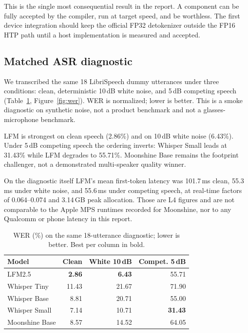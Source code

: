 \documentclass[10pt,twocolumn,letterpaper]{article}
\begin{document}
This is the single most consequential result in the report. A component can be
fully accepted by the compiler, run at target speed, and be worthless. The
first device integration should keep the official FP32 detokenizer outside the
FP16 HTP path until a host implementation is measured and accepted.

\subsection{Matched ASR diagnostic}

We transcribed the same 18 LibriSpeech dummy utterances under three
conditions: clean, deterministic 10\,dB white noise, and 5\,dB competing
speech (Table~\ref{tab:wer}, Figure~\ref{fig:wer}). WER is normalized; lower
is better. This is a smoke diagnostic on synthetic noise, not a product
benchmark and not a glasses-microphone benchmark.

LFM is strongest on clean speech (2.86\%) and on 10\,dB white noise (6.43\%).
Under 5\,dB competing speech the ordering inverts: Whisper Small leads at
31.43\% while LFM degrades to 55.71\%. Moonshine Base remains the footprint
challenger, not a demonstrated multi-speaker quality winner.

On the diagnostic itself LFM's mean first-token latency was 101.7\,ms clean,
55.3\,ms under white noise, and 55.6\,ms under competing speech, at real-time
factors of 0.064--0.074 and 3.14\,GB peak allocation. Those are L4 figures and
are not comparable to the Apple MPS runtimes recorded for Moonshine, nor to
any Qualcomm or phone latency in this report.

\begin{table}[t]
\centering
\small
\caption{WER (\%) on the same 18-utterance diagnostic; lower is better. Best
per column in bold.}
\label{tab:wer}
\begin{tabular}{@{}lrrr@{}}
\toprule
\textbf{Model} & \textbf{Clean} & \textbf{White 10\,dB} & \textbf{Compet. 5\,dB} \\
\midrule
LFM2.5 & \textbf{2.86} & \textbf{6.43} & 55.71 \\
Whisper Tiny & 11.43 & 21.67 & 71.90 \\
Whisper Base & 8.81 & 20.71 & 55.00 \\
Whisper Small & 7.14 & 10.71 & \textbf{31.43} \\
Moonshine Base & 8.57 & 14.52 & 64.05 \\
\bottomrule
\end{tabular}
\end{table}
\end{document}
